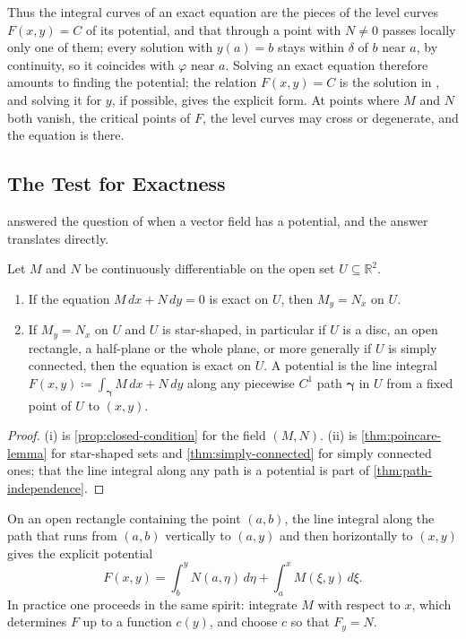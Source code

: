 Thus the integral curves of an exact equation are the pieces of the level curves $F(x,y)=C$ of its potential, and that through a point with $N\ne0$ passes locally only one of them; every solution with $y(a)=b$ stays within $\delta$ of $b$ near $a$, by continuity, so it coincides with $\varphi$ near $a$. Solving an exact equation therefore amounts to finding the potential; the relation $F(x,y)=C$ is the solution in , and solving it for $y$, if possible, gives the explicit form. At points where $M$ and $N$ both vanish, the critical points of $F$, the level curves may cross or degenerate, and the equation is  there.

\subsection{The Test for Exactness}

 answered the question of when a vector field has a potential, and the answer translates directly.

\begin{theorem}
\label{thm:exact-test}
Let $M$ and $N$ be continuously differentiable on the open set $U\subseteq\mathbb R^2$.
\begin{enumerate}
\item If the equation $M\,dx+N\,dy=0$ is exact on $U$, then $M_y=N_x$ on $U$.
\item If $M_y=N_x$ on $U$ and $U$ is star-shaped, in particular if $U$ is a disc, an open rectangle, a half-plane or the whole plane, or more generally if $U$ is simply connected, then the equation is exact on $U$. A potential is the line integral $F(x,y)\coloneqq\int_{\boldsymbol\gamma}M\,dx+N\,dy$ along any piecewise $C^1$ path $\boldsymbol\gamma$ in $U$ from a fixed point of $U$ to $(x,y)$.
\end{enumerate}
\end{theorem}

\begin{proof}
(i) is \cref{prop:closed-condition} for the field $(M,N)$. (ii) is \cref{thm:poincare-lemma} for star-shaped sets and \cref{thm:simply-connected} for simply connected ones; that the line integral along any path is a potential is part of \cref{thm:path-independence}.
\end{proof}

On an open rectangle containing the point $(a,b)$, the line integral along the path that runs from $(a,b)$ vertically to $(a,y)$ and then horizontally to $(x,y)$ gives the explicit potential
\begin{equation}
F(x,y)=\int_b^yN(a,\eta)\,d\eta+\int_a^xM(\xi,y)\,d\xi .
\label{eq:rectangle-potential}
\end{equation}
In practice one proceeds in the same spirit: integrate $M$ with respect to $x$, which determines $F$ up to a function $c(y)$, and choose $c$ so that $F_y=N$.

